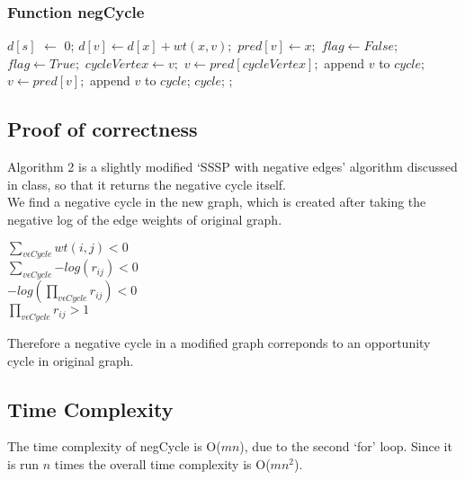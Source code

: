 \documentclass[a4paper,10pt]{article}
\begin{document}
\subsubsection{Function negCycle}
\begin{algorithmic}
\State $d[s]$ $\leftarrow$ 0;
\EndFor
{}
\State $d[v] \leftarrow d[x] + wt(x, v);$ $pred[v] \leftarrow x;$
\EndIf
\EndFor
\EndFor
\State $flag \leftarrow False;$
\State $flag \leftarrow True;$ $cycleVertex \leftarrow v;$
\EndIf
\EndFor
{}
\State $v \leftarrow pred[cycleVertex];$
\State append $v$ to $cycle;$ $v \leftarrow pred[v];$
\EndWhile
\State append $v$ to $cycle$;
\State \Return $cycle$;
\Else
\State {};
\EndIf
\EndFunction
\end{algorithmic}
\subsection{Proof of correctness}
Algorithm 2 is a slightly modified `SSSP with negative edges' algorithm discussed in class, so that it
returns the negative cycle itself.\\
We find a negative cycle in the new graph, which is created after taking the negative log of the
edge weights of original graph.
\begin{center}
 $\displaystyle\sum\limits_{v \epsilon Cycle}{wt(i, j)} < 0$\\
 $\displaystyle\sum\limits_{v \epsilon Cycle}{-log(r_{ij})} < 0$\\
 $-log(\displaystyle\prod\limits_{v \epsilon Cycle}{r_{ij}}) < 0$\\
 $\displaystyle\prod\limits_{v \epsilon Cycle}{r_{ij} > 1}$
\end{center}
Therefore a negative cycle in a modified graph correponds to an opportunity cycle in original graph.
\subsection{Time Complexity}
The time complexity of negCycle is O($mn$), due to the second `for' loop. Since it is run $n$ times the overall time
complexity is O($mn^2$).
\end{document}
